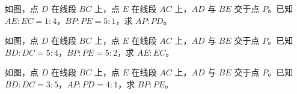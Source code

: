 \documentclass{exam-zh}
\begin{document}
\begin{problem}[points=10]
  \noindent
  \begin{minipage}[t]{\dimexpr\linewidth-60mm-6mm\relax}
    \vspace{0pt}
    如图，点 $D$ 在线段 $BC$ 上，点 $E$ 在线段 $AC$ 上，$AD$ 与 $BE$ 交于点 $P$。已知 $AE:EC=1:4$，$BP:PE=5:1$，求 $AP:PD$。
    
  \end{minipage}\hfill
  \begin{diagramcoltikz}{60mm}{}
  }
  \end{diagramcoltikz}
  \par\medskip
  \answerarea[36mm]
\end{problem}



\begin{problem}[points=10]
  \noindent
  \begin{minipage}[t]{\dimexpr\linewidth-60mm-6mm\relax}
    \vspace{0pt}
    如图，点 $D$ 在线段 $BC$ 上，点 $E$ 在线段 $AC$ 上，$AD$ 与 $BE$ 交于点 $P$。已知 $BD:DC=5:4$，$BP:PE=5:2$，求 $AE:EC$。
    
  \end{minipage}\hfill
  \begin{diagramcoltikz}{60mm}{}
  }
  \end{diagramcoltikz}
  \par\medskip
  \answerarea[36mm]
\end{problem}



\begin{problem}[points=10]
  \noindent
  \begin{minipage}[t]{\dimexpr\linewidth-60mm-6mm\relax}
    \vspace{0pt}
    如图，点 $D$ 在线段 $BC$ 上，点 $E$ 在线段 $AC$ 上，$AD$ 与 $BE$ 交于点 $P$。已知 $BD:DC=3:5$，$AP:PD=4:1$，求 $BP:PE$。
    
  \end{minipage}\hfill
  \begin{diagramcoltikz}{60mm}{}
  }
  \end{diagramcoltikz}
  \par\medskip
  \answerarea[36mm]
\end{problem}
\end{document}
